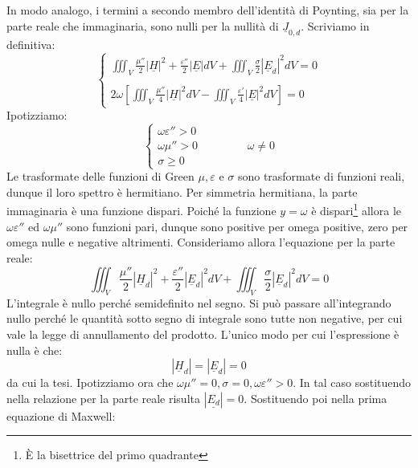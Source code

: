 \documentclass{book}
\begin{document}
         In modo analogo, i termini a secondo membro dell'identità di Poynting, sia per la parte reale che immaginaria, sono nulli per la nullità di $\underline{J}_{0, d}$. Scriviamo in definitiva:
         \begin{equation}
             \begin{cases}
                 \displaystyle \iiint_{V}\frac{\mu''}{2}|\underline{H}|^{2}+\frac{\varepsilon''}{2}|\underline{E}|dV+\iiint_{V} \frac{\sigma}{2}|\underline{E}_{d}|^{2}dV = 0 \\ \\

                \displaystyle 2 \omega [\iiint_{V} \frac{\mu''}{4}|\underline{H}|^{2}dV - \iiint_{V} \frac{\varepsilon'}{4}|\underline{E}|^{2}dV]= 0
             \end{cases}
         \end{equation}
Ipotizziamo:
\begin{equation}
    \begin{cases}
        \omega \varepsilon''>0 \\
        \omega \mu'' > 0 \\
        \sigma \geq 0
    \end{cases} \qquad \qquad \omega \neq 0
\end{equation}
Le trasformate delle funzioni di Green $\mu, \varepsilon$ e $\sigma$ sono trasformate di funzioni reali, dunque il loro spettro è hermitiano. Per simmetria hermitiana, la parte immaginaria è una funzione dispari. Poiché la funzione $y=\omega$ è dispari\footnote{È la bisettrice del primo quadrante} allora le $\omega \varepsilon''$ ed $\omega \mu''$ sono funzioni pari, dunque sono positive per omega positive, zero per omega nulle e negative altrimenti. Consideriamo allora l'equazione per la parte reale:
\begin{equation}
    \iiint_{V}\frac{\mu''}{2}|\underline{H}_{d}|^{2}+\frac{\varepsilon''}{2}|\underline{E} _{d}|^{2} dV+\iiint_{V} \frac{\sigma}{2}|\underline{E}_{d}|^{2}dV = 0
\end{equation}
L'integrale  è nullo perché semidefinito nel segno. Si può passare all'integrando nullo perché le quantità sotto segno di integrale sono tutte non negative, per cui vale la legge di annullamento del prodotto. L'unico modo per cui l'espressione è nulla è che:
\begin{equation}
    |\underline{H}_{d}|=|\underline{E}_{d}|=0
\end{equation}
da cui la tesi.
Ipotizziamo ora che $\omega \mu'' = 0, \sigma =0, \omega \varepsilon''>0$. In tal caso sostituendo nella relazione per la parte reale risulta $|\underline{E_{d}}|=0$. Sostituendo poi nella prima equazione di Maxwell:
\end{document}
